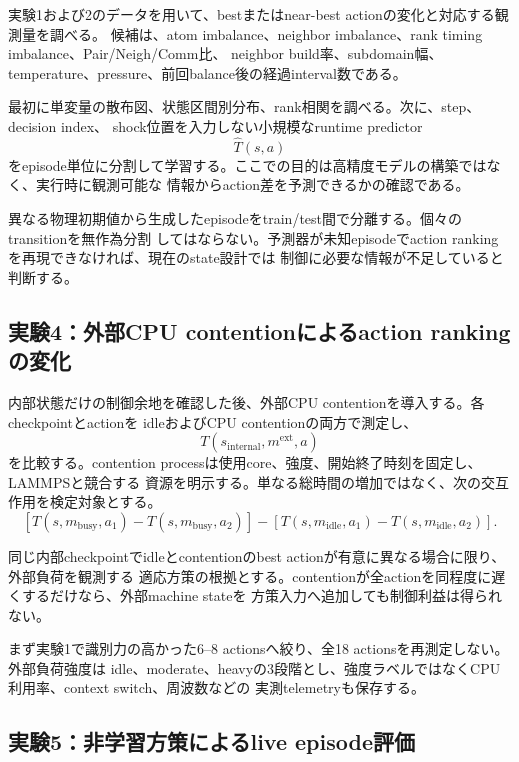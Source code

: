 実験1および2のデータを用いて、bestまたはnear-best actionの変化と対応する観測量を調べる。
候補は、atom imbalance、neighbor imbalance、rank timing imbalance、Pair/Neigh/Comm比、
neighbor build率、subdomain幅、temperature、pressure、前回balance後の経過interval数である。

最初に単変量の散布図、状態区間別分布、rank相関を調べる。次に、step、decision index、
shock位置を入力しない小規模なruntime predictor
\begin{equation}
 \widehat{T}(s,a)
\end{equation}
をepisode単位に分割して学習する。ここでの目的は高精度モデルの構築ではなく、実行時に観測可能な
情報からaction差を予測できるかの確認である。

異なる物理初期値から生成したepisodeをtrain/test間で分離する。個々のtransitionを無作為分割
してはならない。予測器が未知episodeでaction rankingを再現できなければ、現在のstate設計では
制御に必要な情報が不足していると判断する。

\subsection{実験4：外部CPU contentionによるaction rankingの変化}

内部状態だけの制御余地を確認した後、外部CPU contentionを導入する。各checkpointとactionを
idleおよびCPU contentionの両方で測定し、
\begin{equation}
 T(s_{\mathrm{internal}},m^{\mathrm{ext}},a)
\end{equation}
を比較する。contention processは使用core、強度、開始終了時刻を固定し、LAMMPSと競合する
資源を明示する。単なる総時間の増加ではなく、次の交互作用を検定対象とする。
\begin{equation}
 \left[T(s,m_{\mathrm{busy}},a_1)-T(s,m_{\mathrm{busy}},a_2)\right]
 -\left[T(s,m_{\mathrm{idle}},a_1)-T(s,m_{\mathrm{idle}},a_2)\right].
\end{equation}

同じ内部checkpointでidleとcontentionのbest actionが有意に異なる場合に限り、外部負荷を観測する
適応方策の根拠とする。contentionが全actionを同程度に遅くするだけなら、外部machine stateを
方策入力へ追加しても制御利益は得られない。

まず実験1で識別力の高かった6--8 actionsへ絞り、全18 actionsを再測定しない。外部負荷強度は
idle、moderate、heavyの3段階とし、強度ラベルではなくCPU利用率、context switch、周波数などの
実測telemetryも保存する。

\subsection{実験5：非学習方策によるlive episode評価}


